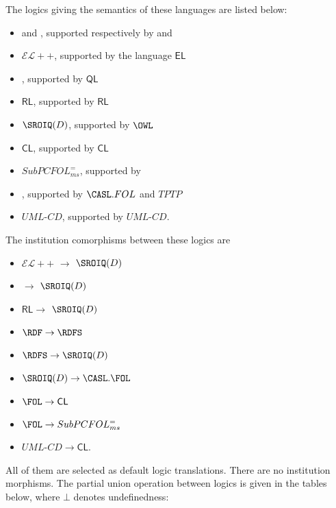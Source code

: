 \documentclass[10pt,fleqn,final]{scrreprt}
\newcommand*{\CL}{\ensuremath{\mathsf{CL}}\xspace}
\newcommand{\QL}{\ensuremath{\mathsf{QL}}\xspace}
\newcommand{\RL}{\ensuremath{\mathsf{RL}}\xspace}
\newcommand{\EL}{\ensuremath{\mathsf{EL}}\xspace}
\newcommand{\ELDL}{\ensuremath{\mathcal{EL}}\xspace}
\newenvironment{definitions}[0]{\medskip }{}
\begin{document}
\begin{definitions}
The logics giving the semantics of these languages are listed below:
\begin{itemize}
 \item \RDF and \RDFS, supported respectively by \RDF and \RDFS
 \item $\ELDL{+}{+}$, supported by the language \EL
 \item \DLLiteR, supported by \QL
 \item \RL, supported by \RL
 \item $\SROIQ(D)$, supported by $\OWL$
 \item \CL, supported by \CL
 \item $SubPCFOL^=_{ms}$, supported by \CASL
 \item \FOL, supported by $\CASL.FOL$ and $TPTP$
 \item $UML\mbox{-}CD$, supported by $UML\mbox{-}CD$.
\end{itemize}

The institution comorphisms between these logics are
\begin{itemize}
  \item $\ELDL{+}{+}$ $\to$ $\SROIQ(D)$ 
  \item \DLLiteR $\to$ $\SROIQ(D)$ 
  \item \RL $\to$ $\SROIQ(D)$ 
  \item $\RDF \to \RDFS$
  \item $\RDFS \to \SROIQ(D)$ 
  \item $\SROIQ(D)  \to \CASL.\FOL$
  \item $\FOL \to \CL$
  \item $\FOL \to SubPCFOL^=_{ms}$
  \item $UML\mbox{-}CD \to \CL$.
\end{itemize}

All of them are selected as default logic translations. There are no institution morphisms. The partial union operation between logics is given in the tables below, where
$\bot$ denotes undefinedness:



\end{definitions}
\end{document}
